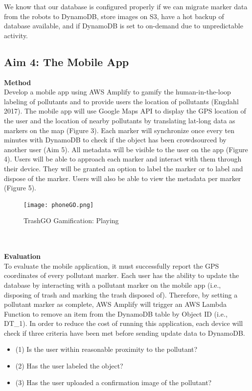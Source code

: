 \documentclass[
  journal=small,
  manuscript=article-type,  %
  year=2022,
  volume=1,
]{cup-journal}
\begin{document}
We know that our database is configured properly if we can 
migrate marker data from the robots to DynamoDB, store images on S3, have a hot backup of database available, and if DynamoDB is set to on-demand due to unpredictable activity. 

\subsection{Aim 4: The Mobile App}
\textbf{Method}\\
Develop a mobile app using AWS Amplify to gamify the human-in-the-loop labeling of pollutants and to provide users the location of pollutants (Engdahl 2017). The mobile app will use Google Maps API to display the GPS location of the user and the location of nearby pollutants by translating lat-long data as markers on the map (Figure 3). Each marker will synchronize once every ten minutes with DynamoDB to check if the object has been crowdsourced by another user (Aim 5). All metadata will be visible to the user on the app (Figure 4). Users will be able to approach each marker and interact with them through their device. They will be granted an option to label the marker or to label and dispose of the marker. Users will also be able to view the metadata per marker (Figure 5).  
\begin{figure}[h!]
    \centering
    \texttt{[image: phoneGO.png]}
    \caption{TrashGO Gamification: Playing}
    \label{trash_gameplay}
\end{figure}
\vspace*{-1.5em}
\\\\\textbf{Evaluation}\\
To evaluate the mobile application, it must successfully report the GPS coordinates of every pollutant marker. Each user has the ability to update the database by interacting with a pollutant marker on the mobile app (i.e., disposing of trash and marking the trash disposed of). Therefore, by setting a pollutant marker as complete, AWS Amplify will trigger an AWS Lambda Function to remove an item from the DynamoDB table by Object ID (i.e., DT\_1). In order to reduce the cost of running this application, each device will check if three criteria have been met before sending update data to DynamoDB.

\begin{itemize}
    \item (1) Is the user within reasonable proximity to the pollutant?
    \item (2) Has the user labeled the object?
    \item (3) Has the user uploaded a confirmation image of the pollutant? 
\end{itemize}
\end{document}
